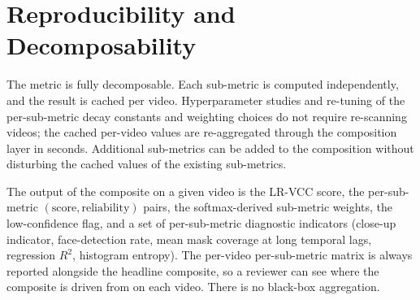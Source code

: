 \section{Reproducibility and Decomposability}
\label{sec:method:repro}

The metric is fully decomposable. Each sub-metric is computed independently, and the
result is cached per video. Hyperparameter studies and re-tuning of the per-sub-metric
decay constants and weighting choices do not require re-scanning videos; the cached
per-video values are re-aggregated through the composition layer in seconds. Additional
sub-metrics can be added to the composition without disturbing the cached values of the
existing sub-metrics.

The output of the composite on a given video is the LR-VCC score, the per-sub-metric
$(\text{score}, \text{reliability})$ pairs, the softmax-derived sub-metric weights, the
low-confidence flag, and a set of per-sub-metric diagnostic indicators (close-up
indicator, face-detection rate, mean mask coverage at long temporal lags, regression
$R^2$, histogram entropy). The per-video per-sub-metric matrix is always reported
alongside the headline composite, so a reviewer can see where the composite is driven
from on each video. There is no black-box aggregation.
